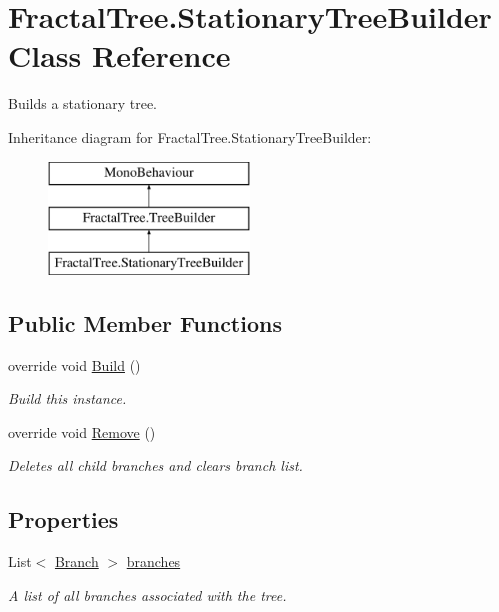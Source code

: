 \hypertarget{class_fractal_tree_1_1_stationary_tree_builder}{}\section{Fractal\+Tree.\+Stationary\+Tree\+Builder Class Reference}
\label{class_fractal_tree_1_1_stationary_tree_builder}


Builds a stationary tree.  


Inheritance diagram for Fractal\+Tree.\+Stationary\+Tree\+Builder\+:\begin{figure}[H]
\begin{center}
\leavevmode
\includegraphics[height=3.000000cm]{class_fractal_tree_1_1_stationary_tree_builder}
\end{center}
\end{figure}
\subsection*{Public Member Functions}
\begin{DoxyCompactItemize}
\item 
override void \hyperlink{class_fractal_tree_1_1_stationary_tree_builder_ab11cfafdc3a0e6c29fe4eef3318331b7}{Build} ()
\begin{DoxyCompactList}\small\item\em Build this instance. \end{DoxyCompactList}\item 
override void \hyperlink{class_fractal_tree_1_1_stationary_tree_builder_a6f7254b5a4ef6ebbdd88abadfc221b4c}{Remove} ()
\begin{DoxyCompactList}\small\item\em Deletes all child branches and clears branch list. \end{DoxyCompactList}\end{DoxyCompactItemize}
\subsection*{Properties}
\begin{DoxyCompactItemize}
\item 
List$<$ \hyperlink{interface_fractal_tree_1_1_branch}{Branch} $>$ \hyperlink{class_fractal_tree_1_1_stationary_tree_builder_a103e903dbfba82226ab6cbb08fff382a}{branches}
\begin{DoxyCompactList}\small\item\em A list of all branches associated with the tree. \end{DoxyCompactList}\end{DoxyCompactItemize}
